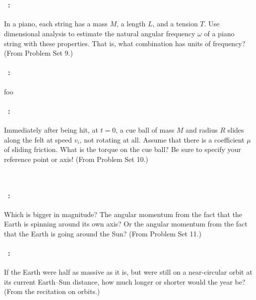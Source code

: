 \documentclass[12pt]{article} 
\begin{document}
\vfill
~
\clearpage

\paragraph{\problemname~\theproblem:}%
In a piano, each string has a mass $M$, a length $L$, and a tension $T$.
Use dimensional analysis to estimate the natural angular
frequency $\omega$ of a piano string with these properties. That is,
what combination has units of frequency?
(From Problem Set 9.)

\vfill

\paragraph{\problemname~\theproblem:}%
foo

\vfill

\paragraph{\problemname~\theproblem:}%
Immediately after being hit, at $t=0$, a cue ball of mass
$M$ and radius $R$ slides along the felt at speed $v_i$, not rotating
at all.
Assume that there is a
coefficient $\mu$ of sliding friction.
What is the torque on the cue ball? Be sure to specify your reference point or axis!
(From Problem Set 10.)

\vfill
~
\clearpage

\paragraph{\problemname~\theproblem:}%
Which is bigger in magnitude? The angular momentum from the fact
that the Earth is spinning around its own axis? Or the angular
momentum from the fact that the Earth is going around the Sun?
(From Problem Set 11.)

\vfill

\paragraph{\problemname~\theproblem:}%
If the Earth were half as massive as it is, but were still
on a near-circular orbit at its current Earth--Sun distance, how much
longer or shorter would the year be?
(From the recitation on orbits.)

\vfill
\end{document}
